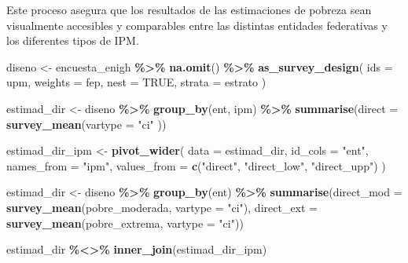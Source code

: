 \documentclass[
  12pt,
]{book}
\newenvironment{Shaded}{\begin{snugshade}}{\end{snugshade}}
\newcommand{\AttributeTok}[1]{\textcolor[rgb]{0.13,0.29,0.53}{#1}}
\newcommand{\ConstantTok}[1]{\textcolor[rgb]{0.56,0.35,0.01}{#1}}
\newcommand{\FunctionTok}[1]{\textcolor[rgb]{0.13,0.29,0.53}{\textbf{#1}}}
\newcommand{\NormalTok}[1]{#1}
\newcommand{\OtherTok}[1]{\textcolor[rgb]{0.56,0.35,0.01}{#1}}
\newcommand{\SpecialCharTok}[1]{\textcolor[rgb]{0.81,0.36,0.00}{\textbf{#1}}}
\newcommand{\StringTok}[1]{\textcolor[rgb]{0.31,0.60,0.02}{#1}}
\begin{document}
Este proceso asegura que los resultados de las estimaciones de pobreza sean visualmente accesibles y comparables entre las distintas entidades federativas y los diferentes tipos de IPM.

\begin{Shaded}
\begin{Highlighting}[]
\NormalTok{diseno }\OtherTok{\textless{}{-}}\NormalTok{ encuesta\_enigh }\SpecialCharTok{\%\textgreater{}\%} \FunctionTok{na.omit}\NormalTok{() }\SpecialCharTok{\%\textgreater{}\%}
  \FunctionTok{as\_survey\_design}\NormalTok{(}
    \AttributeTok{ids =}\NormalTok{ upm,}
    \AttributeTok{weights =}\NormalTok{ fep,}
    \AttributeTok{nest =} \ConstantTok{TRUE}\NormalTok{,}
    \AttributeTok{strata =}\NormalTok{ estrato}
\NormalTok{  )}

\NormalTok{estimad\_dir }\OtherTok{\textless{}{-}}\NormalTok{ diseno }\SpecialCharTok{\%\textgreater{}\%} \FunctionTok{group\_by}\NormalTok{(ent, ipm) }\SpecialCharTok{\%\textgreater{}\%} 
  \FunctionTok{summarise}\NormalTok{(}\AttributeTok{direct =} \FunctionTok{survey\_mean}\NormalTok{(}\AttributeTok{vartype =} \StringTok{"ci"}\NormalTok{ ))}

\NormalTok{estimad\_dir\_ipm }\OtherTok{\textless{}{-}} \FunctionTok{pivot\_wider}\NormalTok{(}
  \AttributeTok{data =}\NormalTok{ estimad\_dir,}
  \AttributeTok{id\_cols =} \StringTok{"ent"}\NormalTok{,}
  \AttributeTok{names\_from =} \StringTok{"ipm"}\NormalTok{,}
  \AttributeTok{values\_from =} \FunctionTok{c}\NormalTok{(}\StringTok{"direct"}\NormalTok{, }\StringTok{"direct\_low"}\NormalTok{, }\StringTok{"direct\_upp"}\NormalTok{)}
\NormalTok{) }

\NormalTok{estimad\_dir }\OtherTok{\textless{}{-}}\NormalTok{ diseno }\SpecialCharTok{\%\textgreater{}\%} \FunctionTok{group\_by}\NormalTok{(ent) }\SpecialCharTok{\%\textgreater{}\%} 
  \FunctionTok{summarise}\NormalTok{(}\AttributeTok{direct\_mod =} \FunctionTok{survey\_mean}\NormalTok{(pobre\_moderada, }\AttributeTok{vartype =} \StringTok{"ci"}\NormalTok{),}
            \AttributeTok{direct\_ext =} \FunctionTok{survey\_mean}\NormalTok{(pobre\_extrema, }\AttributeTok{vartype =} \StringTok{"ci"}\NormalTok{))}

\NormalTok{estimad\_dir }\SpecialCharTok{\%\textless{}\textgreater{}\%} \FunctionTok{inner\_join}\NormalTok{(estimad\_dir\_ipm)}


\end{Highlighting}
\end{Shaded}
\end{document}
